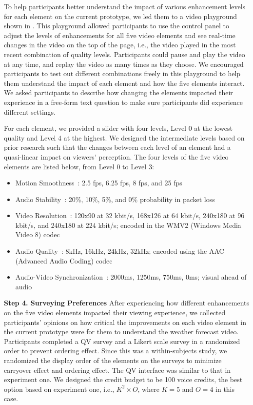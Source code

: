 To help participants better understand the impact of various enhancement levels for each element on the current prototype, we led them to a video playground shown in . This playground allowed participants to use the control panel to adjust the levels of enhancements for all five video elements and see real-time changes in the video on the top of the page, i.e., the video played in the most recent combination of quality levels. Participants could pause and play the video at any time, and replay the video as many times as they choose. We encouraged participants to test out different combinations freely in this playground to help them understand the impact of each element and how the five elements interact. We asked participants to describe how changing the elements impacted their experience in a free-form text question to make sure participants did experience different settings.

For each element, we provided a slider with four levels, Level 0 at the lowest quality and Level 4 at the highest. We designed the intermediate levels based on prior research such that the changes between each level of an element had a quasi-linear impact on viewers' perception. The four levels of the five video elements are listed below, from Level 0 to Level 3:
\begin{itemize}
    \item Motion Smoothness~\cite{huynh2008temporal}: 2.5 fps, 6.25 fps, 8 fps, and 25 fps
    \item Audio Stability~\cite{hardman1998successful}: 20\%, 10\%, 5\%, and 0\% probability in packet loss
    \item Video Resolution~\cite{knoche2005can}: 120x90 at 32 kbit/s, 168x126 at 64 kbit/s, 240x180 at 96 kbit/s, and 240x180 at 224 kbit/s; encoded in the WMV2 (Windows Media Video 8) codec 
    \item Audio Quality~\cite{knoche2008low, noll1993wideband}: 8kHz, 16kHz, 24kHz, 32kHz; encoded using the AAC (Advanced Audio Coding) codec
    \item Audio-Video Synchronization~\cite{steinmetz1996human}: 2000ms, 1250ms, 750ms, 0ms; visual ahead of audio
\end{itemize}

\textbf{Step 4. Surveying Preferences} After experiencing how different enhancements on the five video elements impacted their viewing experience, we collected participants' opinions on how critical the improvements on each video element in the current prototype were for them to understand the weather forecast video. Participants completed  a QV survey and a Likert scale survey in a randomized order to prevent ordering effect. Since this was a within-subjects study, we randomized the display order of the elements on the surveys to minimize carryover effect and ordering effect. The QV interface was similar to that in experiment one. We designed the credit budget to be 100 voice credits, the best option based on experiment one, i.e., $K^2 \times O$, where $K=5$ and $O=4$ in this case.

